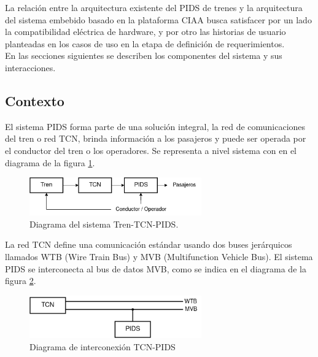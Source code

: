 La relación entre la arquitectura existente del PIDS de trenes y la arquitectura del sistema embebido basado en la plataforma CIAA busca satisfacer por un lado la compatibilidad eléctrica de hardware, y por otro las historias de usuario planteadas en los casos de uso en la etapa de definición de requerimientos. \\

En las secciones siguientes se describen los componentes del sistema y sus interacciones. \

\subsection{Contexto}

El sistema PIDS forma parte de una solución integral, la red de comunicaciones del tren o red TCN, brinda información a los pasajeros y puede ser operada por el conductor del tren o los operadores. Se representa a nivel sistema con en el diagrama de la figura \ref{fig:diagTrenTcnPids}.\\

\begin{figure}[ht]
	\centering
	\includegraphics[width=0.66\textwidth]{./Figures/diagTrenTcnPids.png}
	\caption{Diagrama del sistema Tren-TCN-PIDS.}
	\label{fig:diagTrenTcnPids}
\end{figure}

La red TCN define una comunicación estándar usando dos buses jerárquicos llamados WTB (Wire Train Bus) y MVB (Multifunction Vehicle Bus). El sistema PIDS se interconecta al bus de datos MVB, como se indica en el diagrama de la figura \ref{fig:diagTcnPidsBuusesWtbMvb}.\\


\begin{figure}[ht]
	\centering
	\includegraphics[width=0.66\textwidth]{./Figures/diagTcnPidsBusesWtbMvb.png}
	\caption{Diagrama de interconexión TCN-PIDS}
	\label{fig:diagTcnPidsBuusesWtbMvb}
\end{figure}

